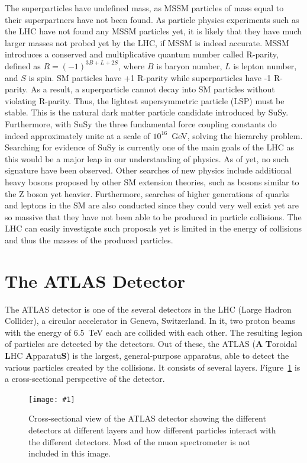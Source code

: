 \documentclass[twocolumn]{article}
\newcommand{\insertFigure}[1]{%
   \texttt{[image: \#1]}%
}
\begin{document}
The superparticles have undefined mass, as MSSM particles of mass equal to their superpartners have not been found. As particle physics experiments such as the LHC have not found any MSSM particles yet, it is likely that they have much larger masses not probed yet by the LHC, if MSSM is indeed accurate. MSSM introduces a conserved and multiplicative quantum number called R-parity, defined as $R = (-1)^{3B+L+2S}$, where $B$ is baryon number, $L$ is lepton number, and $S$ is spin. SM particles have +1 R-parity while superparticles have -1 R-parity. As a result, a superparticle cannot decay into SM particles without violating R-parity. Thus, the lightest supersymmetric particle (LSP) must be stable. This is the natural dark matter particle candidate introduced by SuSy. Furthermore, with SuSy the three fundamental force coupling constants do indeed approximately unite at a scale of $10^{16}$~GeV, solving the hierarchy problem. Searching for evidence of SuSy is currently one of the main goals of the LHC as this would be a major leap in our understanding of physics. As of yet, no such signature have been observed. Other searches of new physics include additional heavy bosons proposed by other SM extension theories, such as bosons similar to the Z boson yet heavier. Furthermore, searches of higher generations of quarks and leptons in the SM are also conducted since they could very well exist yet are so massive that they have not been able to be produced in particle collisions. The LHC can easily investigate such proposals yet is limited in the energy of collisions and thus the masses of the produced particles.
\section{The ATLAS Detector}\label{sec:Exp}
The ATLAS detector is one of the several detectors in the LHC (Large Hadron Collider), a circular accelerator in Geneva, Switzerland. In it, two proton beams with the energy of 6.5~TeV each are collided with each other. The resulting legion %
 of particles are detected by the detectors. Out of these, the ATLAS (\textbf{A} \textbf{T}oroidal \textbf{L}HC \textbf{A}pparatu\textbf{S}) is the largest, general-purpose apparatus, able to detect the various particles created by the collisions. It consists of several layers. Figure~\ref{fig:ATLAS} is a cross-sectional perspective of the detector.
\begin{figure}[!h]
	\centering
	\insertFigure{Images/ATLAS.png}
	\caption{Cross-sectional view of the ATLAS detector showing the different detectors at different layers and how different particles interact with the different detectors. Most of the muon spectrometer is not included in this image.~\cite{manual}}
	\label{fig:ATLAS}
\end{figure}
\end{document}
